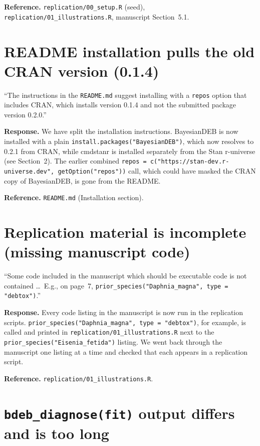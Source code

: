 \documentclass[11pt,a4paper]{article}
\newcommand{\code}[1]{\texttt{#1}}
\newcommand{\pkg}[1]{\textsf{#1}}
\begin{document}
\textbf{Reference.} \code{replication/00\_setup.R} (seed),
\code{replication/01\_illustrations.R}, manuscript Section~5.1.

\section{README installation pulls the old CRAN version (0.1.4)}

\begin{displayquote}
``The instructions in the \code{README.md} suggest installing with a
\code{repos} option that includes CRAN, which installs version 0.1.4 and
not the submitted package version 0.2.0.''
\end{displayquote}

\textbf{Response.} We have split the installation instructions.
\pkg{BayesianDEB} is now installed with a plain
\verb|install.packages("BayesianDEB")|, which now resolves to 0.2.1 from
CRAN, while \pkg{cmdstanr} is installed separately from the Stan
r-universe (see Section~2). The earlier combined
\code{repos = c("https://stan-dev.r-universe.dev", getOption("repos"))}
call, which could have masked the CRAN copy of \pkg{BayesianDEB}, is gone
from the README.

\textbf{Reference.} \code{README.md} (Installation section).

\section{Replication material is incomplete (missing manuscript code)}

\begin{displayquote}
``Some code included in the manuscript which should be executable code is
not contained \ldots\ E.g., on page~7,
\verb|prior_species("Daphnia_magna", type = "debtox")|.''
\end{displayquote}

\textbf{Response.} Every code listing in the manuscript is now run in the
replication scripts. \verb|prior_species("Daphnia_magna", type = "debtox")|,
for example, is called and printed in
\code{replication/01\_illustrations.R} next to the
\verb|prior_species("Eisenia_fetida")| listing. We went back through the
manuscript one listing at a time and checked that each appears in a
replication script.

\textbf{Reference.} \code{replication/01\_illustrations.R}.

\section{\code{bdeb\_diagnose(fit)} output differs and is too long}
\end{document}
